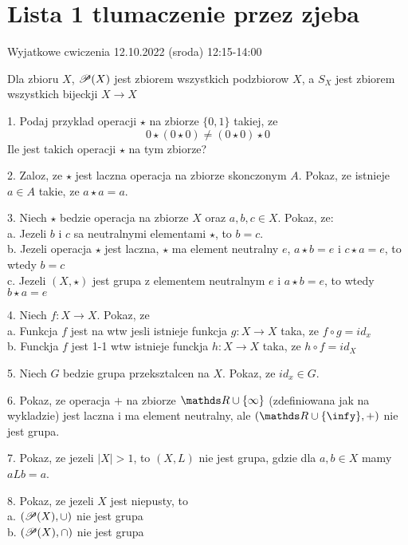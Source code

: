 \documentclass{article}[13pt]
\begin{document}
    \section*{Lista 1 tlumaczenie przez zjeba}

    Wyjatkowe cwiczenia 12.10.2022 (sroda) 12:15-14:00
    \bigskip

    Dla zbioru $X$, $\mathcal{P}(X)$ jest zbiorem wszystkich podzbiorow $X$, a $S_X$ jest zbiorem wszystkich bijeckji $X\to X$
    \medskip

    1. Podaj przyklad operacji $\star$ na zbiorze $\{0,1\}$ takiej, ze
    $$0\star(0\star0)\neq(0\star0)\star0$$
    Ile jest takich operacji $\star$ na tym zbiorze?
    \medskip

    2. Zaloz, ze $\star$ jest laczna operacja na zbiorze skonczonym $A$. Pokaz, ze istnieje $a\in A$ takie, ze $a\star a=a$.
    \medskip

    3. Niech $\star$ bedzie operacja na zbiorze $X$ oraz $a,b,c\in X$. Pokaz, ze:\smallskip\\
        \indent a. Jezeli $b$ i $c$ sa neutralnymi elementami $\star$, to $b=c$.\\
        \indent b. Jezeli operacja $\star$ jest laczna, $\star$ ma element neutralny $e$, $a\star b=e$ i $c\star a=e$, to wtedy $b=c$\\
        \indent c. Jezeli $(X,\star)$ jest grupa z elementem neutralnym $e$ i $a\star b=e$, to wtedy $b\star a=e$
    \medskip

    4. Niech $f:X\to X$. Pokaz, ze\\
        \indent a. Funkcja $f$ jest na wtw jesli istnieje funkcja $g:X\to X$ taka, ze $f\circ g=id_x$\\
        \indent b. Funckja $f$ jest 1-1 wtw istnieje funckja $h:X\to X$ taka, ze $h\circ f=id_X$
    \medskip

    5. Niech $G$ bedzie grupa przeksztalcen na $X$. Pokaz, ze $id_x\in G$.
    \medskip

    6. Pokaz, ze operacja $+$ na zbiorze $\R\cup\{\infty\}$ (zdefiniowana jak na wykladzie) jest laczna i ma element neutralny, ale $(\R\cup\{\infy\},+)$ nie jest grupa.
    \medskip

    7. Pokaz, ze jezeli $|X|>1$, to $(X, L)$ nie jest grupa, gdzie dla $a,b\in X$ mamy $aLb=a$.
    \medskip

    8. Pokaz, ze jezeli $X$ jest niepusty, to\\
        \indent a. $(\mathcal{P}(X), \cup)$ nie jest grupa\\
        \indent b. $(\mathcal{P}(X), \cap )$ nie jest grupa
    \medskip
\end{document}
